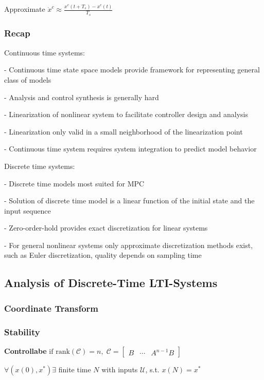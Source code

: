 Approximate
$\dot{x}^c \approx \frac{x^c(t + T_s)-x^c(t)}{T_s}$

\subsubsection{Recap}

Continuous time systems:

- Continuous time state space models provide
framework for representing general class of models

- Analysis and control synthesis is generally hard

- Linearization of nonlinear system to
facilitate controller design and analysis

- Linearization only valid in a small neighborhood
of the linearization point

- Continuous time system requires system
integration to predict model behavior

Discrete time systems:

- Discrete time models most suited for MPC

- Solution of discrete time model is a linear
function of the initial state and the input sequence

- Zero-order-hold provides exact discretization
for linear systems

- For general nonlinear systems only approximate
discretization methods exist, such as Euler
discretization, quality depends on sampling time

\subsection{Analysis of Discrete-Time LTI-Systems}

\subsubsection{Coordinate Transform}

\subsubsection{Stability}
\textbf{Controllabe}
$
	\text{if rank}(\mathcal{C}) = n
	,\;
	\mathcal{C} =
	\begin{bmatrix}
		B & \cdots & A^{n-1} B
	\end{bmatrix}
$

$\forall(x(0),x^*)\exists$ finite time $N$
with inputs $\mathcal{U}$, s.t. $x(N)=x^*$

